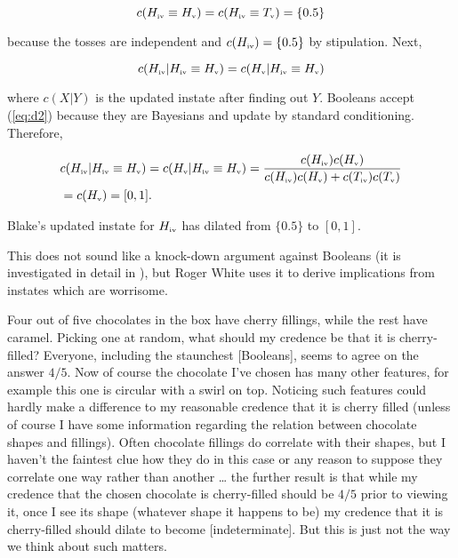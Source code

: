 \documentclass[11pt]{article}
\begin{document}
\begin{equation}
  \label{eq:d1}
  c(H_{\mbox{\tiny{iv}}}\equiv{}H_{\mbox{\tiny{v}}})=c(H_{\mbox{\tiny{iv}}}\equiv{}T_{\mbox{\tiny{v}}})=\{0.5\}
\end{equation}

because the tosses are independent and
$c(H_{\mbox{\tiny{iv}}})=\{0.5\}$ by stipulation. Next,

\begin{equation}
  \label{eq:d2}
  c(H_{\mbox{\tiny{iv}}}|H_{\mbox{\tiny{iv}}}\equiv{}H_{\mbox{\tiny{v}}})=c(H_{\mbox{\tiny{v}}}|H_{\mbox{\tiny{iv}}}\equiv{}H_{\mbox{\tiny{v}}})
\end{equation}

where $c(X|Y)$ is the updated instate after finding out $Y$. Booleans
accept (\ref{eq:d2}) because they are Bayesians and update by standard
conditioning. Therefore,

\begin{align}
  \label{eq:d3}
  &c(H_{\mbox{\tiny{iv}}}|H_{\mbox{\tiny{iv}}}\equiv{}H_{\mbox{\tiny{v}}})=c(H_{\mbox{\tiny{v}}}|H_{\mbox{\tiny{iv}}}\equiv{}H_{\mbox{\tiny{v}}})=\frac{c(H_{\mbox{\tiny{iv}}})c(H_{\mbox{\tiny{v}}})}{c(H_{\mbox{\tiny{iv}}})c(H_{\mbox{\tiny{v}}})+c(T_{\mbox{\tiny{iv}}})c(T_{\mbox{\tiny{v}}})} \notag \\
  &=c(H_{\mbox{\tiny{v}}})=[0,1].
\end{align}

Blake's updated instate for $H_{\mbox{\tiny{iv}}}$ has dilated from
$\{0.5\}$ to $[0,1]$.

This does not sound like a knock-down argument against Booleans (it is
investigated in detail in ), but
Roger White uses it to derive implications from instates which are
worrisome.

\begin{quotex}
  \label{ex:chocolates} Four out of five
  chocolates in the box have cherry fillings, while the rest have
  caramel. Picking one at random, what should my credence be that it
  is cherry-filled? Everyone, including the staunchest [Booleans],
  seems to agree on the answer $4/5$. Now of course the chocolate I've
  chosen has many other features, for example this one is circular
  with a swirl on top. Noticing such features could hardly make a
  difference to my reasonable credence that it is cherry filled
  (unless of course I have some information regarding the relation
  between chocolate shapes and fillings). Often chocolate fillings do
  correlate with their shapes, but I haven't the faintest clue how
  they do in this case or any reason to suppose they correlate one way
  rather than another {\ldots} the further result is that while my
  credence that the chosen chocolate is cherry-filled should be $4/5$
  prior to viewing it, once I see its shape (whatever shape it happens
  to be) my credence that it is cherry-filled should dilate to become
  [indeterminate]. But this is just not the way we think about such
  matters. 
\end{quotex}
\end{document}
